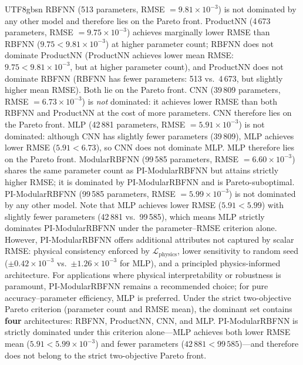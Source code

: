 \documentclass[a4paper,12pt]{report}
\newcommand{\Lphys}{\mathcal{L}_{\text{physics}}}
\begin{document}
\begin{CJK}{UTF8}{gbsn}
RBFNN (513 parameters, RMSE $= 9.81 \times 10^{-3}$) is not dominated by any
other model and therefore lies on the Pareto front.
ProductNN (4\,673 parameters, RMSE $= 9.75 \times 10^{-3}$) achieves marginally lower
RMSE than RBFNN ($9.75 < 9.81 \times 10^{-3}$) at higher parameter count;
RBFNN does not dominate ProductNN (ProductNN achieves lower mean RMSE:
$9.75 < 9.81 \times 10^{-3}$, but at higher parameter count), and ProductNN does not
dominate RBFNN (RBFNN has fewer parameters: 513 vs.\ 4\,673, but slightly higher mean
RMSE). Both lie on the Pareto front.
CNN (39\,809 parameters, RMSE $= 6.73 \times 10^{-3}$) is \emph{not} dominated:
it achieves lower RMSE than both RBFNN and ProductNN at the cost of more parameters.
CNN therefore lies on the Pareto front.
MLP (42\,881 parameters, RMSE $= 5.91 \times 10^{-3}$) is not dominated: although CNN
has slightly fewer parameters (39\,809), MLP achieves lower RMSE ($5.91 < 6.73$),
so CNN does not dominate MLP. MLP therefore lies on the Pareto front.
ModularRBFNN (99\,585 parameters, RMSE $= 6.60 \times 10^{-3}$) shares the same
parameter count as PI-ModularRBFNN but attains strictly higher RMSE; it is dominated
by PI-ModularRBFNN and is Pareto-suboptimal.
PI-ModularRBFNN (99\,585 parameters, RMSE $= 5.99 \times 10^{-3}$) is not dominated
by any other model. Note that MLP achieves lower RMSE ($5.91 < 5.99$) with slightly
fewer parameters (42\,881 vs.\ 99\,585), which means MLP strictly dominates
PI-ModularRBFNN under the parameter--RMSE criterion alone.
However, PI-ModularRBFNN offers additional attributes not captured by scalar RMSE:
physical consistency enforced by $\Lphys$, lower sensitivity to random seed
($\pm0.42\times10^{-3}$ vs.\ $\pm1.26\times10^{-3}$ for MLP), and a principled
physics-informed architecture. For applications where physical interpretability or
robustness is paramount, PI-ModularRBFNN remains a recommended choice; for pure
accuracy--parameter efficiency, MLP is preferred.
Under the strict two-objective Pareto criterion (parameter count and RMSE mean), the
dominant set contains \textbf{four} architectures: RBFNN, ProductNN, CNN, and MLP.
PI-ModularRBFNN is strictly dominated under this criterion alone---MLP achieves both
lower RMSE mean ($5.91 < 5.99 \times 10^{-3}$) and fewer parameters
($42\,881 < 99\,585$)---and therefore does not belong to the strict two-objective
Pareto front.


\end{CJK}
\end{document}
